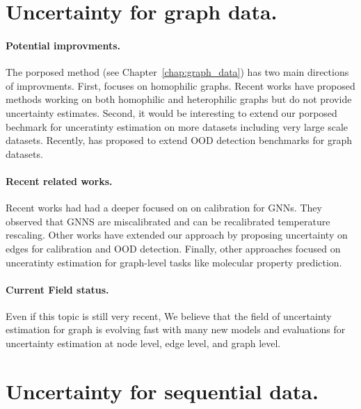 \section{Uncertainty for graph data.}

\paragraph{Potential improvments.} The porposed method \GPNacro{} (see Chapter~\ref{chap:graph_data}) has two main directions of improvments. First, \GPNacro{} focuses on homophilic graphs. Recent works have proposed methods \cite{bodnar2022sheaf, giovanni2022graff} working on both homophilic and heterophilic graphs but do not provide uncertainty estimates. Second, it would be interesting to extend our porposed bechmark for unceratinty estimation on more datasets including very large scale datasets. Recently, \cite{gui2022good} has proposed to extend OOD detection benchmarks for graph datasets.


\paragraph{Recent related works.} Recent works \cite{texeira2019GNNmiscalibrated, hsu2022GNNmiscalibrated, wang2021confident} had had a deeper focused on on calibration for GNNs. They observed that GNNS are miscalibrated and can be recalibrated temperature rescaling. Other works \cite{zhou2022OODlink, hsu2022structure} have extended our approach by proposing uncertainty on edges for calibration and OOD detection. Finally, other approaches \cite{soleimany2021evidential} focused on unceratinty estimation for graph-level tasks like molecular property prediction.

\paragraph{Current Field status.} Even if this topic is still very recent, We believe that the field of uncertainty estimation for graph is evolving fast with many new models and evaluations for uncertainty estimation at node level, edge level, and graph level. 

\section{Uncertainty for sequential data.}

